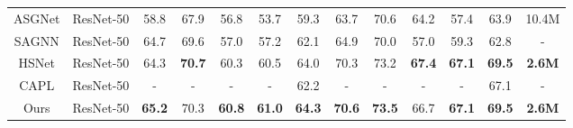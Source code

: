 \documentclass[lettersize,journal]{IEEEtran}
\begin{document}
\begin{table*}
\begin{tabular}{c|c|ccccc|ccccc|c}
ASGNet  \cite{RN9}                  & ResNet-50                 & 58.8                                        & 67.9                                        & 56.8                                        & 53.7                               & 59.3          & 63.7                                        & 70.6                                        & 64.2                                        & 57.4                               & 63.9                      & 10.4M                                                                          \\
SAGNN \cite{RN83}                    & ResNet-50                 & 64.7                                        & 69.6                                        & 57.0                                        & 57.2                               & 62.1          & 64.9                                        & 70.0                                        & 57.0                                        & 59.3                               & 62.8                      & -                                                                              \\
HSNet \cite{RN85}                    & ResNet-50                 & 64.3                                        & \textbf{70.7}                               & 60.3                                        & 60.5                               & 64.0          & 70.3                                        & 73.2                                        & \textbf{67.4}                               & \textbf{67.1}                      & \textbf{69.5}             & \textbf{2.6M}                                                                  \\
CAPL \cite{RN64}                    & ResNet-50                 & -                                           & -                                           & -                                           & -                                  & 62.2          & -                                           & -                                           & -                                           & -                                  & 67.1                      & -                                                                              \\ 
\hline
Ours                    & ResNet-50                 & \textbf{65.2}                               & 70.3                                        & \textbf{60.8}                              & \textbf{61.0}                      & \textbf{64.3} & \textbf{70.6}                               & \textbf{73.5}                               & 66.7                                        & \textbf{67.1}                      & \textbf{69.5}             & \textbf{2.6M}                                                                  \\ 

\end{tabular}
\end{table*}
\end{document}

